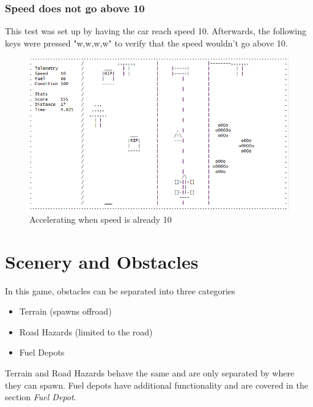 \documentclass{article}
\begin{document}
\subsubsection*{Speed does not go above 10}
This test was set up by having the car reach speed 10. Afterwards, the following keys were pressed "w,w,w,w" to verify that the speed wouldn't go above 10. 
\begin{figure}[!ht]
	\begin{center}
	\includegraphics[width=0.667\paperwidth]{images/speed_test_maxacel10}
	\caption{Accelerating when speed is already 10}
	\label{fig:speed_test_acel10} 
	\end{center}
\end{figure}

\clearpage

\section{Scenery and Obstacles}
In this game, obstacles can be separated into three categories
\begin{itemize}
 	\item Terrain (spawns offroad)
 	\item Road Hazards (limited to the road)
	\item Fuel Depots
\end{itemize}
Terrain and Road Hazards behave the same and are only separated by where they can spawn. Fuel depots have additional functionality and are covered in the section \emph{Fuel Depot}. 
\end{document}
